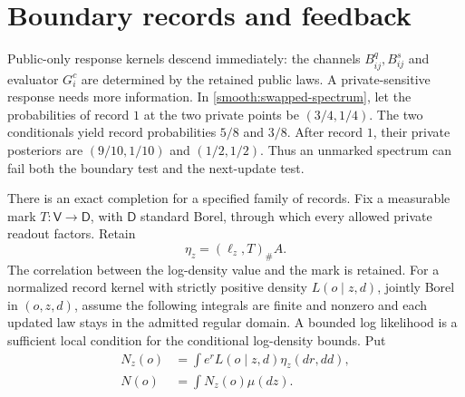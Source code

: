 \section{Boundary records and feedback}
\label{sec:smooth-records}

Public-only response kernels descend immediately: the channels $B_{ij}^q,B_{ij}^s$ and evaluator $G_i^c$ are determined by the retained public laws. A private-sensitive response needs more information. In \cref{smooth:swapped-spectrum}, let the probabilities of record $1$ at the two private points be $(3/4,1/4)$. The two conditionals yield record probabilities $5/8$ and $3/8$. After record $1$, their private posteriors are $(9/10,1/10)$ and $(1/2,1/2)$. Thus an unmarked spectrum can fail both the boundary test and the next-update test.

There is an exact completion for a specified family of records. Fix a measurable mark $T:\mathsf V\to\mathsf D$, with $\mathsf D$ standard Borel, through which every allowed private readout factors. Retain
\begin{equation}
 \eta_z=(\ell_z,T)_\#A.
 \label{smooth:marked-spectrum}
\end{equation}
The correlation between the log-density value and the mark is retained. For a normalized record kernel with strictly positive density $L(o\mid z,d)$, jointly Borel in $(o,z,d)$, assume the following integrals are finite and nonzero and each updated law stays in the admitted regular domain. A bounded log likelihood is a sufficient local condition for the conditional log-density bounds. Put
\begin{equation}
 \begin{aligned}
 N_z(o)&=\int e^r L(o\mid z,d)\eta_z(dr,dd),\\
 N(o)&=\int N_z(o)\mu(dz).
 \end{aligned}
 \label{smooth:record-normalizers}
\end{equation}

